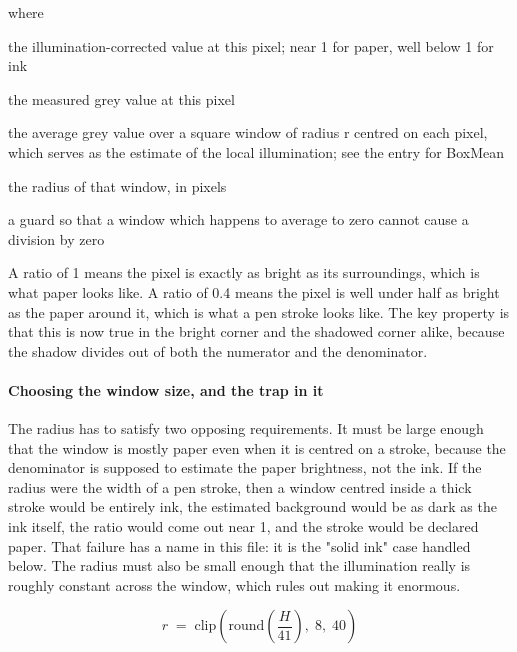 \noindent where
\begin{description}[leftmargin=2.4em,style=nextline,font=\normalfont\ttfamily]\setlength\itemsep{1pt}
  \item[{$\mathrm{ratio}[y,x]$}] \normalfont the illumination-corrected value at this pixel; near 1 for paper, well below 1 for ink
  \item[{$\mathrm{gray}[y,x]$}] \normalfont the measured grey value at this pixel
  \item[{$\mathrm{BoxMean}(\mathrm{gray},r)$}] \normalfont the average grey value over a square window of radius r centred on each pixel, which serves as the estimate of the local illumination; see the entry for BoxMean
  \item[{$r$}] \normalfont the radius of that window, in pixels
  \item[{$\max(\cdot,\,1)$}] \normalfont a guard so that a window which happens to average to zero cannot cause a division by zero
\end{description}
A ratio of 1 means the pixel is exactly as bright as its surroundings, which is what paper looks like. A ratio of 0.4 means the pixel is well under half as bright as the paper around it, which is what a pen stroke looks like. The key property is that this is now true in the bright corner and the shadowed corner alike, because the shadow divides out of both the numerator and the denominator.


\paragraph{Choosing the window size, and the trap in it}
The radius has to satisfy two opposing requirements. It must be large enough that the window is mostly paper even when it is centred on a stroke, because the denominator is supposed to estimate the paper brightness, not the ink. If the radius were the width of a pen stroke, then a window centred inside a thick stroke would be entirely ink, the estimated background would be as dark as the ink itself, the ratio would come out near 1, and the stroke would be declared paper. That failure has a name in this file: it is the "solid ink" case handled below. The radius must also be small enough that the illumination really is roughly constant across the window, which rules out making it enormous.


\begin{equation}
r \;=\; \mathrm{clip}\!\left(\mathrm{round}\!\left(\frac{H}{41}\right),\; 8,\; 40\right)
\end{equation}

